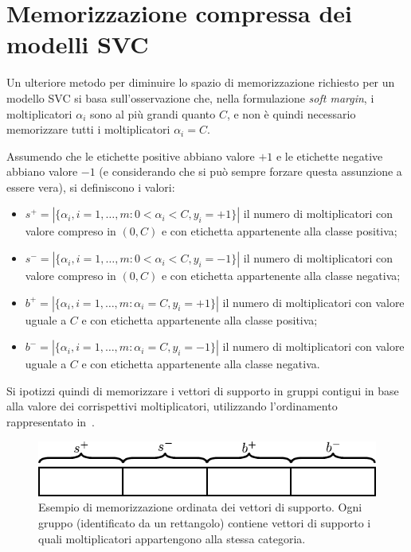 \section{Memorizzazione compressa dei modelli SVC}\label{sec:memorizzazione_compressa}
Un ulteriore metodo per diminuire lo spazio di memorizzazione richiesto per un modello SVC si basa sull'osservazione che, nella formulazione \emph{soft margin}, i moltiplicatori $\alpha_i$ sono al più grandi quanto $C$, e non è quindi necessario memorizzare tutti i moltiplicatori $\alpha_i = C$.

Assumendo che le etichette positive abbiano valore $+1$ e le etichette negative abbiano valore $-1$ (e considerando che si può sempre forzare questa assunzione a essere vera), si definiscono i valori:
\begin{itemize}
    \item $s^+ = |\{\alpha_i, i=1,\dots,m : 0 < \alpha_i < C, y_i=+1\}|$ il numero di moltiplicatori con valore compreso in $(0, C)$ e con etichetta appartenente alla classe positiva;
    \item $s^- = |\{\alpha_i, i=1,\dots,m : 0 < \alpha_i < C, y_i=-1\}|$ il numero di moltiplicatori con valore compreso in $(0, C)$ e con etichetta appartenente alla classe negativa;
    \item $b^+ = |\{\alpha_i, i=1,\dots,m : \alpha_i = C, y_i=+1\}|$ il numero di moltiplicatori con valore uguale a $C$ e con etichetta appartenente alla classe positiva;
    \item $b^- = |\{\alpha_i, i=1,\dots,m : \alpha_i = C, y_i=-1\}|$ il numero di moltiplicatori con valore uguale a $C$ e con etichetta appartenente alla classe negativa.
\end{itemize}
Si ipotizzi quindi di memorizzare i vettori di supporto in gruppi contigui in base alla valore dei corrispettivi moltiplicatori, utilizzando l'ordinamento rappresentato in~.
\begin{figure}
    \centering
    \includegraphics{img/memorizzazione_sv.pdf}
    \caption{Esempio di memorizzazione ordinata dei vettori di supporto. Ogni gruppo (identificato da un rettangolo) contiene vettori di supporto i quali moltiplicatori appartengono alla stessa categoria.}
    \label{fig:schema_memorizzazione_sv}
\end{figure}
